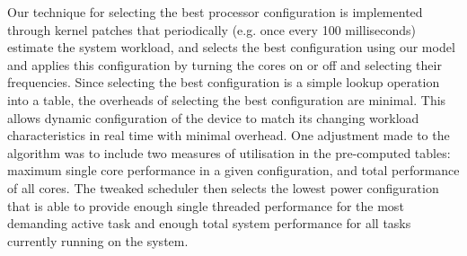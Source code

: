 \documentclass[conference]{IEEEtran}
\begin{document}
Our technique for selecting the best processor configuration is implemented through kernel patches that periodically (e.g. once every 100 milliseconds) estimate the system workload, and selects the best configuration using our model and applies this configuration by turning the cores on or off and selecting their frequencies. Since selecting the best configuration is a simple lookup operation into a table, the overheads of selecting the best configuration are minimal. This allows dynamic configuration of the device to match its changing workload characteristics in real time with minimal overhead. One adjustment made to the algorithm was to include two measures of utilisation in the pre-computed tables: maximum single core performance in a given configuration, and total performance of all cores. The tweaked scheduler then selects the lowest power configuration that is able to provide enough single threaded performance for the most demanding active task and enough total system performance for all tasks currently running on the system. 

\end{document}
